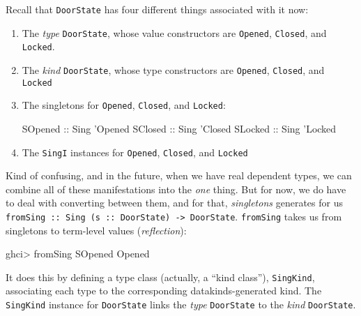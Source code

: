 \documentclass[]{article}
\newenvironment{Shaded}{\begin{snugshade}}{\end{snugshade}}
\newcommand{\CharTok}[1]{\textcolor[rgb]{0.31,0.60,0.02}{#1}}
\newcommand{\DataTypeTok}[1]{\textcolor[rgb]{0.13,0.29,0.53}{#1}}
\newcommand{\FunctionTok}[1]{\textcolor[rgb]{0.00,0.00,0.00}{#1}}
\newcommand{\NormalTok}[1]{#1}
\newcommand{\OtherTok}[1]{\textcolor[rgb]{0.56,0.35,0.01}{#1}}
\begin{document}
Recall that \texttt{DoorState} has four different things associated with it now:

\begin{enumerate}
\def\labelenumi{\arabic{enumi}.}
\item
  The \emph{type} \texttt{DoorState}, whose value constructors are
  \texttt{Opened}, \texttt{Closed}, and \texttt{Locked}.
\item
  The \emph{kind} \texttt{DoorState}, whose type constructors are
  \texttt{\textquotesingle{}Opened}, \texttt{\textquotesingle{}Closed}, and
  \texttt{\textquotesingle{}Locked}
\item
  The singletons for \texttt{\textquotesingle{}Opened},
  \texttt{\textquotesingle{}Closed}, and \texttt{\textquotesingle{}Locked}:

\begin{Shaded}
\begin{Highlighting}[]
\DataTypeTok{SOpened}\OtherTok{ ::} \DataTypeTok{Sing} \CharTok{'Opened}
\DataTypeTok{SClosed}\OtherTok{ ::} \DataTypeTok{Sing} \CharTok{'Closed}
\DataTypeTok{SLocked}\OtherTok{ ::} \DataTypeTok{Sing} \CharTok{'Locked}
\end{Highlighting}
\end{Shaded}
\item
  The \texttt{SingI} instances for \texttt{\textquotesingle{}Opened},
  \texttt{\textquotesingle{}Closed}, and
  \texttt{\textquotesingle{}Locked\textquotesingle{}}
\end{enumerate}

Kind of confusing, and in the future, when we have real dependent types, we can
combine all of these manifestations into the \emph{one} thing. But for now, we
do have to deal with converting between them, and for that, \emph{singletons}
generates for us
\texttt{fromSing\ ::\ Sing\ (s\ ::\ DoorState)\ -\textgreater{}\ DoorState}.
\texttt{fromSing} takes us from singletons to term-level values
(\emph{reflection}):

\begin{Shaded}
\begin{Highlighting}[]
\NormalTok{ghci}\FunctionTok{>}\NormalTok{ fromSing }\DataTypeTok{SOpened}
\DataTypeTok{Opened}
\end{Highlighting}
\end{Shaded}

It does this by defining a type class (actually, a ``kind class''),
\texttt{SingKind}, associating each type to the corresponding
datakinds-generated kind. The \texttt{SingKind} instance for \texttt{DoorState}
links the \emph{type} \texttt{DoorState} to the \emph{kind} \texttt{DoorState}.
\end{document}
